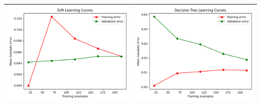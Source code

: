 \begin{table}[H]
    \centering
    \footnotesize
    \setlength\tabcolsep{0pt}
    \begin{tabularx}{\textwidth}{|X|X|}
        \hline
        \includegraphics[width=\linewidth, trim=0 0 0 0]{images/SVR_lc90.png} &
        \includegraphics[width=\linewidth, trim=0 0 0 0]{images/DecisionTree_lc90.png} \\
        \hline

\end{tabularx}
\end{table}
